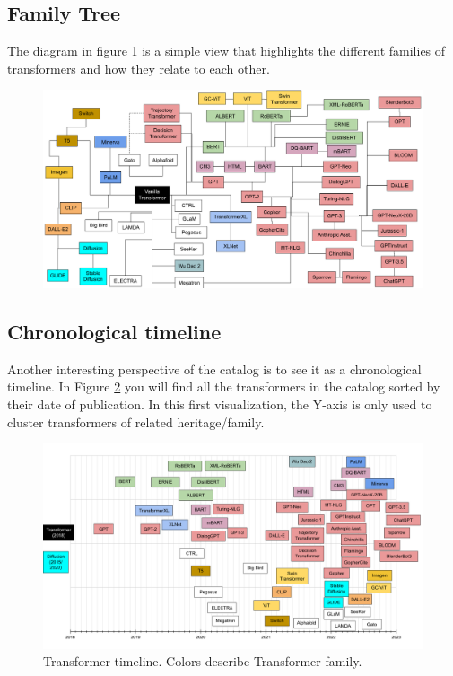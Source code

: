 \documentclass{article}
\begin{document}
\subsection{Family Tree}

The diagram in figure \ref{fig:tree} is a simple view that highlights the different families of transformers and how they relate to each other.

\begin{figure}
    \centering
    \includegraphics[width=\textwidth,height=\textheight,keepaspectratio]{02-05.png}
    \caption{}
    \label{fig:tree}
\end{figure}

\subsection{Chronological timeline}

Another interesting perspective of the catalog is to see it as a chronological timeline. In Figure \ref{fig:timeline} you will find all the transformers in the catalog sorted by their date of publication. In this first visualization, the Y-axis is only used to cluster transformers of related heritage/family.

\begin{figure}
    \centering
    \includegraphics[width=\textwidth,height=\textheight,keepaspectratio]{02-06.png}
    \caption{Transformer timeline. Colors describe Transformer family.}
    \label{fig:timeline}
\end{figure}
\end{document}
